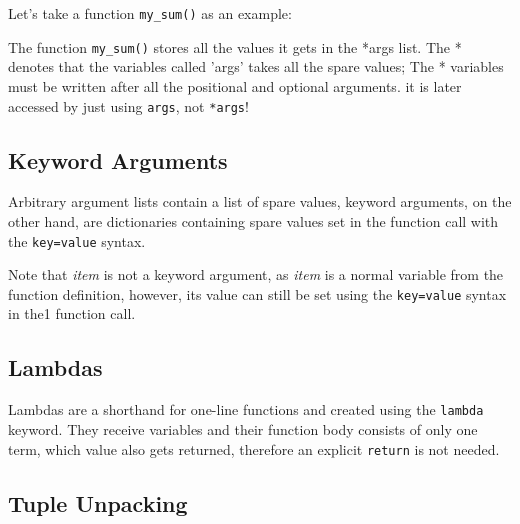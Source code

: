     Let's take a function \texttt{my_sum()} as an example:


    The function \texttt{my_sum()} stores all the values it gets in the *args list.
    The * denotes that the variables called 'args' takes all the spare values; The * variables must
    be written after all the positional and optional arguments.
    it is later accessed by just using \texttt{args}, not \texttt{*args}!
  
  \subsection{Keyword Arguments}
    Arbitrary argument lists contain a list of spare values, keyword arguments, on the other hand,
    are dictionaries containing spare values set in the function call with the
    \texttt{key=value} syntax.


    Note that \textit{item} is not a keyword argument, as \textit{item} is a normal variable
    from the function definition, however, its value can still be set using the
    \texttt{key=value} syntax in the1 function call.
    

  
  \subsection{Lambdas}
    Lambdas are a shorthand for one-line functions and created using the
    \texttt{lambda} keyword. They receive variables and their function body consists
    of only one term, which value also gets returned, therefore an explicit
    \texttt{return} is not needed.


  \subsection{Tuple Unpacking}